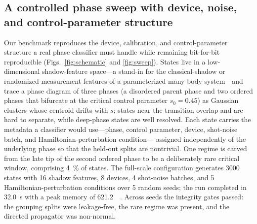 \documentclass[aps,prresearch,reprint,amsmath,amssymb,nofootinbib,superscriptaddress,floatfix]{revtex4-2}
\theoremstyle{definition}
\theoremstyle{remark}
\theoremstyle{plain}
\begin{document}
\subsection{A controlled phase sweep with device, noise, and control-parameter structure}
Our benchmark reproduces the device, calibration, and control-parameter structure a real phase classifier
must handle while remaining bit-for-bit reproducible (Figs.~\ref{fig:schematic} and \ref{fig:sweep}).
States live in a low-dimensional shadow-feature space---a stand-in for the classical-shadow or
randomized-measurement features of a parameterized many-body system---and trace a phase diagram of three
phases (a disordered parent phase and two ordered phases that bifurcate at the critical control parameter
$s_0=0.45$) as Gaussian clusters whose centroid drifts with $s$; states near the transition overlap and are
hard to separate, while deep-phase states are well resolved. Each state carries the metadata a classifier
would use---phase, control parameter, device, shot-noise batch, and Hamiltonian-perturbation condition---%
assigned independently of the underlying phase so that the held-out splits are nontrivial. One regime is
carved from the late tip of the second ordered phase to be a deliberately rare critical window, comprising
\SI{4}{\percent} of states. The full-scale configuration generates \num{3000} states with \num{16} shadow
features, \num{8} devices, \num{4} shot-noise batches, and \num{5} Hamiltonian-perturbation conditions over
\num{5} random seeds; the run completed in \SI{32.0}{\second} with a peak memory of \SI{621.2}{\mega\byte}.
Across seeds the integrity gates passed: the grouping splits were leakage-free, the rare regime was
present, and the directed propagator was non-normal.
\end{document}
